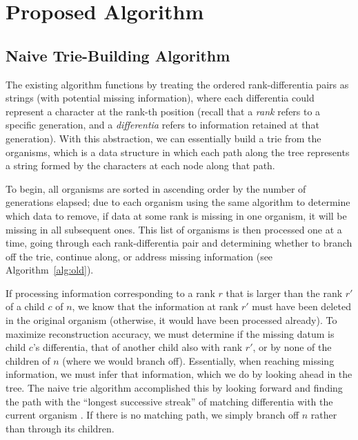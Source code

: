 \section{Proposed Algorithm} \label{sec:algorithm}

\subsection{Naive Trie-Building Algorithm} \label{sec:algorithm:naive}

The existing algorithm functions by treating the ordered rank-differentia pairs as strings (with potential missing information), where each differentia could represent a character at the rank-th position (recall that a \textit{rank} refers to a specific generation, and a \textit{differentia} refers to information retained at that generation).
With this abstraction, we can essentially build a trie \citep{fredkin1960trie} from the organisms, which is a data structure in which each path along the tree represents a string formed by the characters at each node along that path.

To begin, all organisms are sorted in ascending order by the number of generations elapsed; due to each organism using the same algorithm to determine which data to remove, if data at some rank is missing in one organism, it will be missing in all subsequent ones.
This list of organisms is then processed one at a time, going through each rank-differentia pair and determining whether to branch off the trie, continue along, or address missing information (see Algorithm~\ref{alg:old}).



If processing information corresponding to a rank $r$ that is larger than the rank $r'$ of a child $c$ of $n$, we know that the information at rank $r'$ must have been deleted in the original organism (otherwise, it would have been processed already).
To maximize reconstruction accuracy, we must determine if the missing datum is child $c$'s differentia, that of another child also with rank $r'$, or by none of the children of $n$ (where we would branch off).
Essentially, when reaching missing information, we must infer that information, which we do by looking ahead in the tree. The naive  trie algorithm accomplished this by looking forward and finding the path with the ``longest successive streak'' of matching differentia with the current organism \citep{moreno2024analysis}.
If there is no matching path, we simply branch off $n$ rather than through its children.

